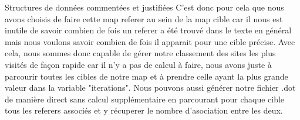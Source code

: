 \documentclass{article}
\begin{document}
\begin{section}{Structures de données commentées et justifiées}
C'est donc pour cela que nous avons choisis de faire cette map referer au sein de la map cible car il nous est inutile de savoir combien de fois un referer a été trouvé dans le texte en général mais nous voulons savoir combien de fois il apparait pour une cible précise.
Avec cela, nous sommes donc capable de gérer notre classement des sites les plus visités de façon rapide car il n'y a pas de calcul à faire, nous avons juste à parcourir toutes les cibles de notre map et à prendre celle ayant la plus grande valeur dans la variable "iterations". Nous pouvons aussi générer notre fichier .dot de manière direct sans calcul supplémentaire en parcourant pour chaque cible tous les referers associés et y récuperer le nombre d'asociation entre les deux.

\end{section}
\end{document}

